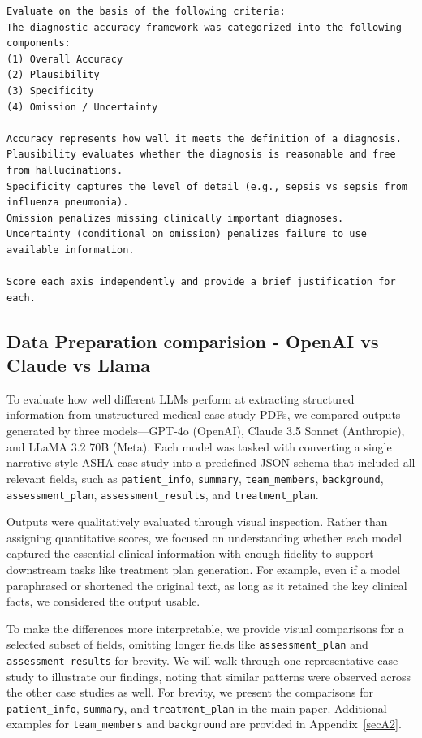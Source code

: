 \documentclass[pdflatex,sn-mathphys-num]{sn-jnl}%
\theoremstyle{thmstyleone}%
\theoremstyle{thmstyletwo}%
\theoremstyle{thmstylethree}%
\begin{document}
\begin{tcolorbox}[mypromptbox, title={LLM-as-a-Judge Evaluation Prompt}]
\begin{lstlisting}
Evaluate on the basis of the following criteria:
The diagnostic accuracy framework was categorized into the following components: 
(1) Overall Accuracy 
(2) Plausibility 
(3) Specificity 
(4) Omission / Uncertainty

Accuracy represents how well it meets the definition of a diagnosis. 
Plausibility evaluates whether the diagnosis is reasonable and free from hallucinations. 
Specificity captures the level of detail (e.g., sepsis vs sepsis from influenza pneumonia). 
Omission penalizes missing clinically important diagnoses. 
Uncertainty (conditional on omission) penalizes failure to use available information.

Score each axis independently and provide a brief justification for each.
\end{lstlisting}
\end{tcolorbox}

\subsection{Data Preparation comparision - OpenAI vs Claude vs Llama}\label{subsec4.2}

To evaluate how well different LLMs perform at extracting structured information from unstructured medical case study PDFs, we compared outputs generated by three models—GPT-4o (OpenAI), Claude 3.5 Sonnet (Anthropic), and LLaMA 3.2 70B (Meta). Each model was tasked with converting a single narrative-style ASHA case study into a predefined JSON schema that included all relevant fields, such as \texttt{patient\_info}, \texttt{summary}, \texttt{team\_members}, \texttt{background}, \texttt{assessment\_plan}, \texttt{assessment\_results}, and \texttt{treatment\_plan}.

Outputs were qualitatively evaluated through visual inspection. Rather than assigning quantitative scores, we focused on understanding whether each model captured the essential clinical information with enough fidelity to support downstream tasks like treatment plan generation. For example, even if a model paraphrased or shortened the original text, as long as it retained the key clinical facts, we considered the output usable.

To make the differences more interpretable, we provide visual comparisons for a selected subset of fields, omitting longer fields like \texttt{assessment\_plan} and \texttt{assessment\_results} for brevity. We will walk through one representative case study to illustrate our findings, noting that similar patterns were observed across the other case studies as well. For brevity, we present the comparisons for \texttt{patient\_info}, \texttt{summary}, and \texttt{treatment\_plan} in the main paper. Additional examples for \texttt{team\_members} and \texttt{background} are provided in Appendix~\ref{secA2}.
\end{document}
